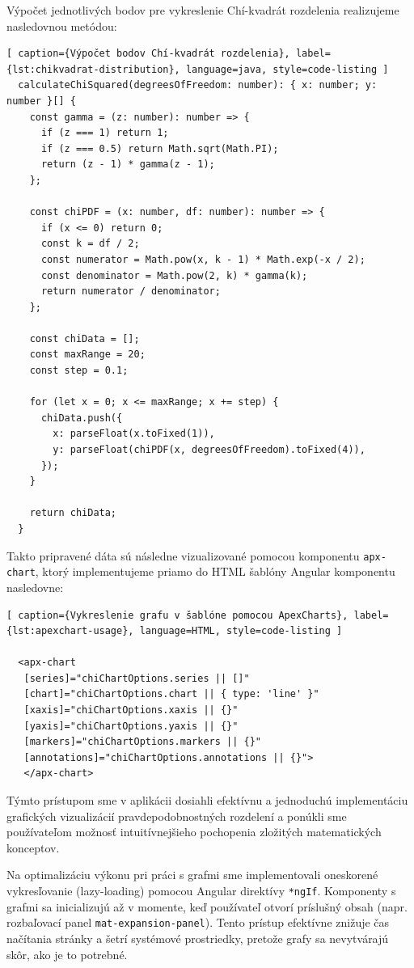  Výpočet jednotlivých bodov pre vykreslenie Chí-kvadrát rozdelenia realizujeme nasledovnou metódou:
 
 \begin{lstlisting}[ caption={Výpočet bodov Chí-kvadrát rozdelenia}, label={lst:chikvadrat-distribution}, language=java, style=code-listing ] 
  calculateChiSquared(degreesOfFreedom: number): { x: number; y: number }[] {
    const gamma = (z: number): number => {
      if (z === 1) return 1;
      if (z === 0.5) return Math.sqrt(Math.PI);
      return (z - 1) * gamma(z - 1);
    };

    const chiPDF = (x: number, df: number): number => {
      if (x <= 0) return 0;
      const k = df / 2;
      const numerator = Math.pow(x, k - 1) * Math.exp(-x / 2);
      const denominator = Math.pow(2, k) * gamma(k);
      return numerator / denominator;
    };

    const chiData = [];
    const maxRange = 20;
    const step = 0.1;

    for (let x = 0; x <= maxRange; x += step) {
      chiData.push({
        x: parseFloat(x.toFixed(1)),
        y: parseFloat(chiPDF(x, degreesOfFreedom).toFixed(4)),
      });
    }

    return chiData;
  } 

\end{lstlisting}

Takto pripravené dáta sú následne vizualizované pomocou komponentu \texttt{apx-chart}, ktorý implementujeme priamo do HTML šablóny Angular komponentu nasledovne:

\begin{lstlisting}[ caption={Vykreslenie grafu v šablóne pomocou ApexCharts}, label={lst:apexchart-usage}, language=HTML, style=code-listing ]
  
  <apx-chart 
   [series]="chiChartOptions.series || []" 
   [chart]="chiChartOptions.chart || { type: 'line' }" 
   [xaxis]="chiChartOptions.xaxis || {}" 
   [yaxis]="chiChartOptions.yaxis || {}" 
   [markers]="chiChartOptions.markers || {}" 
   [annotations]="chiChartOptions.annotations || {}"> 
   </apx-chart> 

  \end{lstlisting}

Týmto prístupom sme v aplikácii dosiahli efektívnu a jednoduchú implementáciu grafických vizualizácií pravdepodobnostných rozdelení a ponúkli sme používateľom možnosť intuitívnejšieho pochopenia zložitých matematických konceptov.

Na optimalizáciu výkonu pri práci s grafmi sme implementovali oneskorené vykresľovanie (lazy-loading) pomocou Angular direktívy \texttt{*ngIf}. 
Komponenty s grafmi sa inicializujú až v momente, keď používateľ otvorí príslušný obsah (napr. rozbaľovací panel \texttt{mat-expansion-panel}).
 Tento prístup efektívne znižuje čas načítania stránky a šetrí systémové prostriedky, pretože grafy sa nevytvárajú skôr, ako je to potrebné.
 

